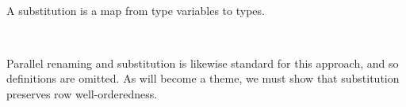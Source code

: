 \documentclass[authoryear, acmsmall, screen, review, nonacm]{acmart} %
\begin{document}
\begin{code}[hide]
\>[0]\AgdaSpace{}%
\AgdaSymbol{:}\AgdaSpace{}%
\AgdaSpace{}%
\AgdaSpace{}%
\AgdaSpace{}%
\AgdaOperator{\AgdaInductiveConstructor{R[}}\AgdaSpace{}%
\AgdaSpace{}%
\AgdaOperator{\AgdaInductiveConstructor{]}}\AgdaSpace{}%
\AgdaSpace{}%
\AgdaSpace{}%
\AgdaSpace{}%
\AgdaSymbol{(}\AgdaSpace{}%
\AgdaOperator{\AgdaInductiveConstructor{,,}}\AgdaSpace{}%
\AgdaSymbol{)}\AgdaSpace{}%
\AgdaOperator{\AgdaInductiveConstructor{R[}}\AgdaSpace{}%
\AgdaSpace{}%
\AgdaOperator{\AgdaInductiveConstructor{]}}\<%
\\
\>[0]\AgdaSpace{}%
\AgdaSymbol{=}\AgdaSpace{}%
\AgdaSpace{}%
\<%
\end{code}

A substitution is a map from type variables to types.

\begin{code}%
\>[0]\AgdaSpace{}%
\AgdaSymbol{:}\AgdaSpace{}%
\AgdaSpace{}%
\AgdaSpace{}%
\AgdaSpace{}%
\AgdaSpace{}%
\<%
\\
\>[0]\AgdaSpace{}%
\AgdaSpace{}%
\AgdaSpace{}%
\AgdaSymbol{=}\AgdaSpace{}%
\AgdaSpace{}%
\AgdaSymbol{\{}\AgdaSymbol{\}}\AgdaSpace{}%
\AgdaSpace{}%
\AgdaSpace{}%
\AgdaSpace{}%
\AgdaSpace{}%
\AgdaSpace{}%
\AgdaSpace{}%
\AgdaSpace{}%
\<%
\end{code}

\Ni Parallel renaming and substitution is likewise standard for this approach, and so definitions are omitted. As will become a theme, we must show that substitution preserves row well-orderedness.
\end{document}
